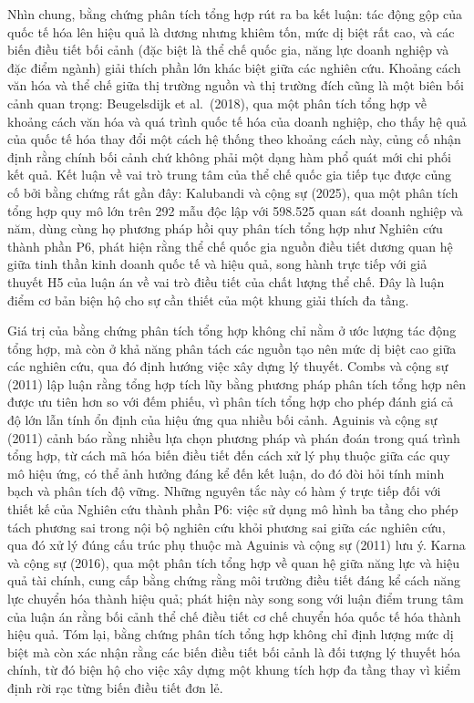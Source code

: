 \documentclass[
  a4paper,
  13pt]{extreport}
\begin{document}
Nhìn chung, bằng chứng phân tích tổng hợp rút ra ba kết luận: tác động
gộp của quốc tế hóa lên hiệu quả là dương nhưng khiêm tốn, mức dị biệt
rất cao, và các biến điều tiết bối cảnh (đặc biệt là thể chế quốc gia,
năng lực doanh nghiệp và đặc điểm ngành) giải thích phần lớn khác biệt
giữa các nghiên cứu. Khoảng cách văn hóa và thể chế giữa thị trường
nguồn và thị trường đích cũng là một biên bối cảnh quan trọng:
Beugelsdijk et al.~(2018), qua một phân tích tổng hợp về khoảng cách văn
hóa và quá trình quốc tế hóa của doanh nghiệp, cho thấy hệ quả của quốc
tế hóa thay đổi một cách hệ thống theo khoảng cách này, củng cố nhận
định rằng chính bối cảnh chứ không phải một dạng hàm phổ quát mới chi
phối kết quả. Kết luận về vai trò trung tâm của thể chế quốc gia tiếp
tục được củng cố bởi bằng chứng rất gần đây: Kalubandi và cộng sự
(2025), qua một phân tích tổng hợp quy mô lớn trên 292 mẫu độc lập với
598.525 quan sát doanh nghiệp và năm, dùng cùng họ phương pháp hồi quy
phân tích tổng hợp như Nghiên cứu thành phần P6, phát hiện rằng thể chế
quốc gia nguồn điều tiết dương quan hệ giữa tinh thần kinh doanh quốc tế
và hiệu quả, song hành trực tiếp với giả thuyết H5 của luận án về vai
trò điều tiết của chất lượng thể chế. Đây là luận điểm cơ bản biện hộ
cho sự cần thiết của một khung giải thích đa tầng.

Giá trị của bằng chứng phân tích tổng hợp không chỉ nằm ở ước lượng tác
động tổng hợp, mà còn ở khả năng phân tách các nguồn tạo nên mức dị biệt
cao giữa các nghiên cứu, qua đó định hướng việc xây dựng lý thuyết.
Combs và cộng sự (2011) lập luận rằng tổng hợp tích lũy bằng phương pháp
phân tích tổng hợp nên được ưu tiên hơn so với đếm phiếu, vì phân tích
tổng hợp cho phép đánh giá cả độ lớn lẫn tính ổn định của hiệu ứng qua
nhiều bối cảnh. Aguinis và cộng sự (2011) cảnh báo rằng nhiều lựa chọn
phương pháp và phán đoán trong quá trình tổng hợp, từ cách mã hóa biến
điều tiết đến cách xử lý phụ thuộc giữa các quy mô hiệu ứng, có thể ảnh
hưởng đáng kể đến kết luận, do đó đòi hỏi tính minh bạch và phân tích độ
vững. Những nguyên tắc này có hàm ý trực tiếp đối với thiết kế của
Nghiên cứu thành phần P6: việc sử dụng mô hình ba tầng cho phép tách
phương sai trong nội bộ nghiên cứu khỏi phương sai giữa các nghiên cứu,
qua đó xử lý đúng cấu trúc phụ thuộc mà Aguinis và cộng sự (2011) lưu ý.
Karna và cộng sự (2016), qua một phân tích tổng hợp về quan hệ giữa năng
lực và hiệu quả tài chính, cung cấp bằng chứng rằng môi trường điều tiết
đáng kể cách năng lực chuyển hóa thành hiệu quả; phát hiện này song song
với luận điểm trung tâm của luận án rằng bối cảnh thể chế điều tiết cơ
chế chuyển hóa quốc tế hóa thành hiệu quả. Tóm lại, bằng chứng phân tích
tổng hợp không chỉ định lượng mức dị biệt mà còn xác nhận rằng các biến
điều tiết bối cảnh là đối tượng lý thuyết hóa chính, từ đó biện hộ cho
việc xây dựng một khung tích hợp đa tầng thay vì kiểm định rời rạc từng
biến điều tiết đơn lẻ.
\end{document}
